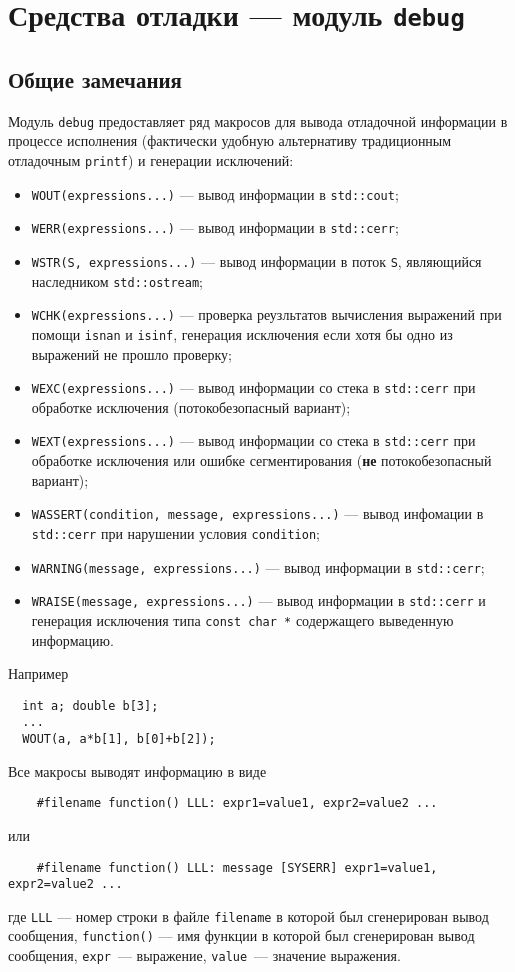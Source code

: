\section{Средства отладки --- модуль {\tt debug}}\label{debug:sec}
\subsection{Общие замечания}
Модуль \verb'debug' предоставляет ряд макросов для вывода отладочной информации в процессе исполнения
(фактически удобную альтернативу традиционным отладочным \verb'printf') и генерации исключений:
\begin{itemize}
  \item\verb'WOUT(expressions...)' --- вывод информации в \verb'std::cout';
  \item\verb'WERR(expressions...)' --- вывод информации в \verb'std::cerr';
  \item\verb'WSTR(S, expressions...)' --- вывод информации в поток \verb'S', являющийся наследником \verb'std::ostream';
  \item\verb'WCHK(expressions...)' --- проверка реузльтатов вычисления выражений при помощи \verb'isnan' и \verb'isinf',
    генерация исключения если хотя бы одно из выражений не прошло проверку;
  \item\verb'WEXC(expressions...)' --- вывод информации со стека в \verb'std::cerr' при обработке исключения (потокобезопасный вариант); 
  \item\verb'WEXT(expressions...)' --- вывод информации со стека в \verb'std::cerr' при обработке исключения или ошибке сегментирования
    ({\bf не} потокобезопасный вариант); 
  \item\verb'WASSERT(condition, message, expressions...)' --- вывод инфомации в \verb'std::cerr'
    при нарушении условия \verb'condition';
  \item\verb'WARNING(message, expressions...)' --- вывод информации в \verb'std::cerr';
  \item\verb'WRAISE(message, expressions...)' --- вывод информации в \verb'std::cerr'
    и генерация исключения типа \verb'const char *' содержащего выведенную информацию.
\end{itemize}
Например
\begin{verbatim}
  int a; double b[3];
  ...
  WOUT(a, a*b[1], b[0]+b[2]);
\end{verbatim}

Все макросы выводят информацию в виде
\begin{verbatim}
    #filename function() LLL: expr1=value1, expr2=value2 ...
\end{verbatim}
или
\begin{verbatim}
    #filename function() LLL: message [SYSERR] expr1=value1, expr2=value2 ...
\end{verbatim}
где \verb'LLL' --- номер строки в файле \verb'filename' в которой был сгенерирован вывод сообщения,
\verb'function()' --- имя функции в которой был сгенерирован вывод сообщения, \verb'expr'~--- выражение,
\verb'value'~--- значение выражения.

